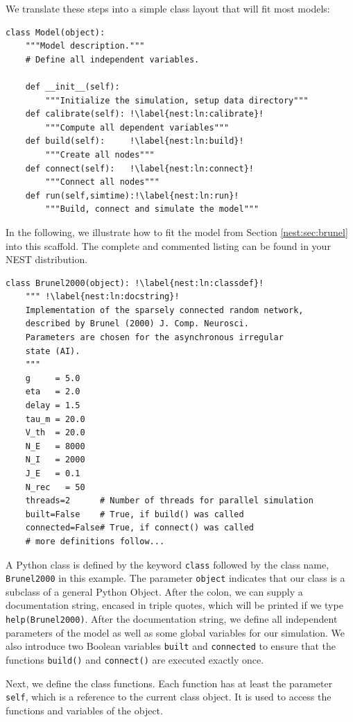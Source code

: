 \documentclass{article}
\begin{document}
We translate these steps into a simple class layout that will fit
most models:
\renewcommand*\thelstnumber{c\arabic{lstnumber}}
\begin{lstlisting}[name=classes]
class Model(object):
    """Model description."""
    # Define all independent variables.

    def __init__(self):
        """Initialize the simulation, setup data directory"""
    def calibrate(self): !\label{nest:ln:calibrate}!
        """Compute all dependent variables"""
    def build(self):     !\label{nest:ln:build}!
        """Create all nodes"""
    def connect(self):   !\label{nest:ln:connect}!
        """Connect all nodes"""
    def run(self,simtime):!\label{nest:ln:run}!
        """Build, connect and simulate the model"""
\end{lstlisting}
In the following, we illustrate how to fit the model from Section
\ref{nest:sec:brunel} into this scaffold. The complete and commented
listing can be found in your NEST distribution.

\begin{lstlisting}[name=brunel-classes]
class Brunel2000(object): !\label{nest:ln:classdef}!
    """ !\label{nest:ln:docstring}!
    Implementation of the sparsely connected random network, 
    described by Brunel (2000) J. Comp. Neurosci.  
    Parameters are chosen for the asynchronous irregular
    state (AI).
    """
    g     = 5.0 
    eta   = 2.0
    delay = 1.5
    tau_m = 20.0
    V_th  = 20.0
    N_E   = 8000
    N_I   = 2000
    J_E   = 0.1
    N_rec   = 50
    threads=2      # Number of threads for parallel simulation
    built=False    # True, if build() was called
    connected=False# True, if connect() was called
    # more definitions follow...
\end{lstlisting}
A Python class is defined by the keyword \lstinline!class! followed by
the class name, \lstinline!Brunel2000! in this example. The parameter
\lstinline!object! indicates that our class is a subclass of a general
Python Object. After the colon, we can supply a documentation string,
encased in triple quotes, which will be printed if we type
\lstinline{help(Brunel2000)}.  After the documentation string, we
define all independent parameters of the model as well as some global
variables for our simulation. We also introduce two Boolean variables
\lstinline!built!  and \lstinline!connected! to ensure that the
functions \lstinline!build()! and \lstinline!connect()! are executed
exactly once.

Next, we define the class functions. Each function has at least the
parameter \lstinline!self!, which is a reference to the
current class object. It is used to access the functions and
variables of the object.
\end{document}
